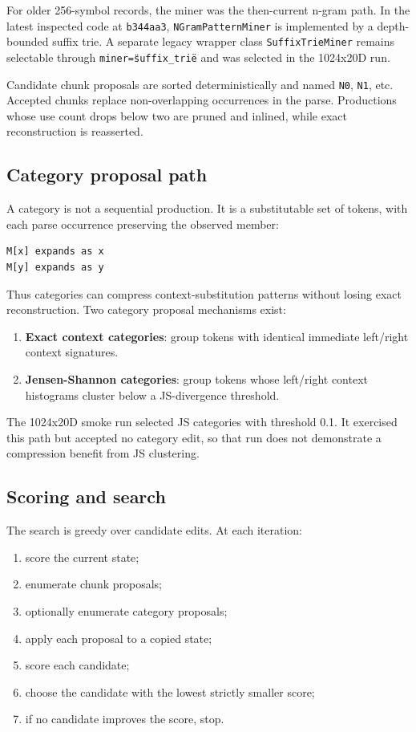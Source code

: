 \documentclass[11pt]{article}
\begin{document}
For older 256-symbol records, the miner was the then-current n-gram path. In the latest inspected code at \texttt{b344aa3}, \texttt{NGramPatternMiner} is implemented by a depth-bounded suffix trie. A separate legacy wrapper class \texttt{SuffixTrieMiner} remains selectable through \texttt{miner=\"suffix\_trie\"} and was selected in the 1024x20D run.

Candidate chunk proposals are sorted deterministically and named \texttt{N0}, \texttt{N1}, etc. Accepted chunks replace non-overlapping occurrences in the parse. Productions whose use count drops below two are pruned and inlined, while exact reconstruction is reasserted.

\subsection{Category proposal path}

A category is not a sequential production. It is a substitutable set of tokens, with each parse occurrence preserving the observed member:

\begin{lstlisting}
M[x] expands as x
M[y] expands as y
\end{lstlisting}

Thus categories can compress context-substitution patterns without losing exact reconstruction. Two category proposal mechanisms exist:

\begin{enumerate}[leftmargin=*]
\item \textbf{Exact context categories}: group tokens with identical immediate left/right context signatures.
\item \textbf{Jensen-Shannon categories}: group tokens whose left/right context histograms cluster below a JS-divergence threshold.
\end{enumerate}

The 1024x20D smoke run selected JS categories with threshold 0.1. It exercised this path but accepted no category edit, so that run does not demonstrate a compression benefit from JS clustering.

\subsection{Scoring and search}

The search is greedy over candidate edits. At each iteration:

\begin{enumerate}[leftmargin=*]
\item score the current state;
\item enumerate chunk proposals;
\item optionally enumerate category proposals;
\item apply each proposal to a copied state;
\item score each candidate;
\item choose the candidate with the lowest strictly smaller score;
\item if no candidate improves the score, stop.
\end{enumerate}
\end{document}
